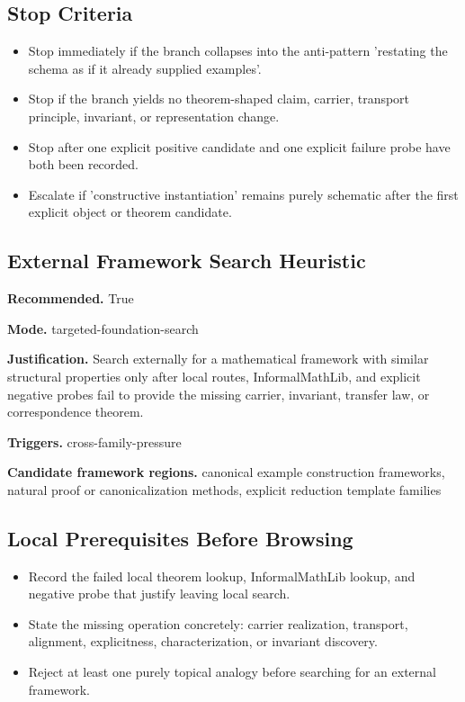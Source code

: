 \documentclass[11pt]{article}
\begin{document}
\subsection*{Stop Criteria}
\begin{itemize}[leftmargin=*,itemsep=0.2em]
\item Stop immediately if the branch collapses into the anti-pattern 'restating the schema as if it already supplied examples'.
\item Stop if the branch yields no theorem-shaped claim, carrier, transport principle, invariant, or representation change.
\item Stop after one explicit positive candidate and one explicit failure probe have both been recorded.
\item Escalate if 'constructive instantiation' remains purely schematic after the first explicit object or theorem candidate.
\end{itemize}
\subsection*{External Framework Search Heuristic}
\textbf{Recommended.} True

\textbf{Mode.} targeted-foundation-search

\textbf{Justification.} Search externally for a mathematical framework with similar structural properties only after local routes, InformalMathLib, and explicit negative probes fail to provide the missing carrier, invariant, transfer law, or correspondence theorem.

\textbf{Triggers.} cross-family-pressure

\textbf{Candidate framework regions.} canonical example construction frameworks, natural proof or canonicalization methods, explicit reduction template families

\subsection*{Local Prerequisites Before Browsing}
\begin{itemize}[leftmargin=*,itemsep=0.2em]
\item Record the failed local theorem lookup, InformalMathLib lookup, and negative probe that justify leaving local search.
\item State the missing operation concretely: carrier realization, transport, alignment, explicitness, characterization, or invariant discovery.
\item Reject at least one purely topical analogy before searching for an external framework.
\end{itemize}
\end{document}

